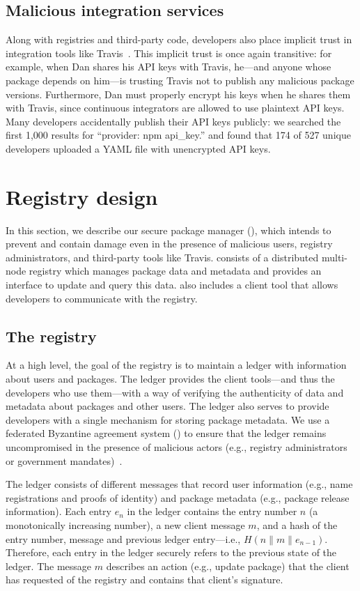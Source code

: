 \subsection{Malicious integration services}
Along with registries and third-party code, developers also place implicit trust in
integration tools like Travis~\cite{travis}. This implicit trust is once again
transitive: for example, when Dan shares his API keys with Travis, he---and
anyone whose package depends on him---is trusting Travis not to publish any
malicious package versions. Furthermore, Dan must properly encrypt his keys
when he shares them with Travis, since continuous integrators are allowed to
use plaintext API keys. Many developers accidentally publish their
API keys publicly: we searched the first 1,000 \gh results for ``provider: npm api\_key.''
and found that 174 of 527 unique \gh developers uploaded a YAML file
with unencrypted API keys. 


\section{Registry design}\label{design}
In this section, we describe our secure package manager (\spam), which intends to
prevent and contain damage even in the presence of malicious users, registry
administrators, and third-party tools like Travis. \spam consists of
a distributed multi-node registry which manages package data and metadata and
provides an interface to update and query this data. \spam also includes a
client tool that allows developers to communicate with the registry.

\subsection{The registry}
At a high level, the goal of the registry is to maintain a ledger
with information about users and packages. The ledger provides
the client tools---and thus the developers who use them---with a way of
verifying the authenticity of data and metadata about packages and other users.
The ledger also serves to provide developers with a single
mechanism for storing package metadata. We use a federated Byzantine
agreement system (\fbas) to ensure that the ledger remains uncompromised in the
presence of malicious actors (e.g., registry administrators or government
mandates)~\cite{stellar}.

The ledger consists of different messages that record
user information (e.g., name registrations and proofs of identity) and
package metadata (e.g., package release information). 
Each entry $e_n$ in the ledger contains the entry number $n$ (a monotonically
increasing number), a new client message $m$, and a hash of the entry number, message and previous ledger entry---i.e., $H(n\|m\|e_{n-1})$.
Therefore, each entry in the ledger securely refers to the previous state of the
ledger.  The message $m$ describes an action (e.g., update package) that the client
has requested of the registry and contains that client's signature. 

